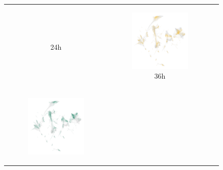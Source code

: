\documentclass[runningheads]{llncs}
\begin{document}
\begin{figure}[H]
{\begin{tabular}{ccc}
\begin{subfigure}[b]{0.3\textwidth}
        \caption{24h}
        \label{fig:umap_24h}
      \end{subfigure} &
      \begin{subfigure}[b]{0.3\textwidth}
        \centering
        \includegraphics[width=\textwidth]{fig_umap_36h_optimized.png}
        \caption{36h}
        \label{fig:umap_36h}
      \end{subfigure} \\
      \begin{subfigure}[b]{0.3\textwidth}
        \centering
        \includegraphics[width=\textwidth]{fig_umap_48h_optimized.png}

\end{subfigure}
\end{tabular}}
\end{figure}
\end{document}

